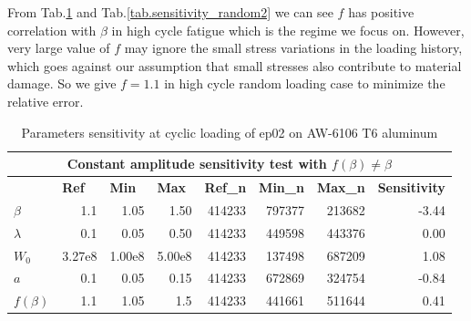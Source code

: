 \documentclass[3p,times,procedia,number]{elsarticle}
\begin{document}
From Tab.\ref{tab.sensitivity_const2} and Tab.\ref{tab.sensitivity_random2} we can see $f$ has positive correlation with $\beta$ in high cycle fatigue which is the regime we focus on.  However, very large value of $f$ may ignore the small stress variations in the loading history, which goes against our assumption that small stresses also contribute to material damage. So we give $f=1.1$ in high cycle random loading case to minimize the relative error.
\begin{table}[!h]
	\centering
	\begin{tabular}{lrrrrrrr}
		\hline
		\multicolumn{8}{c}{\textbf{Constant amplitude sensitivity test with $f(\beta)\neq\beta$}}                                                                                                                                                                                                 \\ \hline
		& \multicolumn{1}{l}{\textbf{Ref}} & \multicolumn{1}{l}{\textbf{Min}} & \multicolumn{1}{l}{\textbf{Max}} & \multicolumn{1}{l}{\textbf{Ref\_n}} & \multicolumn{1}{l}{\textbf{Min\_n}} & \multicolumn{1}{l}{\textbf{Max\_n}} & \multicolumn{1}{l}{\textbf{Sensitivity}} \\ \hline
		\textbf{$\beta$}    & 1.1                              & 1.05                             & 1.50                             & 414233                              & 797377                              & 213682                              & -3.44                                    \\
		\textbf{$\lambda$}  & 0.1                              & 0.05                             & 0.50                             & 414233                              & 449598                              & 443376                              & 0.00                                     \\
		\textbf{$W_0$}      & 3.27e8                         & 1.00e8                         & 5.00e8                         & 414233                              & 137498                              & 687209                              & 1.08                                     \\
		\textbf{$a$}        & 0.1                              & 0.05                             & 0.15                             & 414233                              & 672869                              & 324754                              & -0.84                                    \\
		\textbf{$f(\beta)$} & 1.1                              & 1.05                             & 1.5                              & 414233                              & 441661          &511644          & 0.41                                     \\ \hline
	\end{tabular}
	\caption{Parameters sensitivity at cyclic loading of ep02 on AW-6106 T6 aluminum}
	\label{tab.sensitivity_const2}
\end{table}
\end{document}
